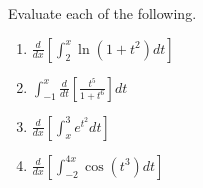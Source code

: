 Evaluate each of the following.

\begin{enumerate}

    \item {} $\displaystyle \frac d {dx} \left[ \int _2 ^x \ln \left( 1 + t^2 \right) dt \right]$

    \item {} $\displaystyle \int _{-1} ^x \frac d {dt} \left[ \frac {t^5} {1 + t^6} \right] dt$

    \item {} $\displaystyle \frac d {dx} \left[ \int _x ^3 e^{t^2} dt \right]$

    \item {} $\displaystyle \frac d {dx} \left[ \int _{-2} ^{4x} \cos \left( t^3 \right) dt \right]$
    
\end{enumerate}